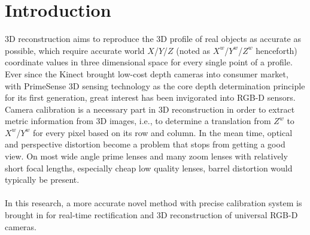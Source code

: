 \chapter{Introduction} %
\label{sens_introduction} %
3D reconstruction aims to reproduce the 3D profile of real objects as accurate as possible, which require accurate world \(X\)/\(Y\)/\(Z\) (noted as \(X^{w}\)/\(Y^{w}\)/\(Z^{w}\)  henceforth) coordinate values in three dimensional space for every single point of a profile. Ever since the Kinect brought low-cost depth cameras into consumer market, with PrimeSense 3D sensing technology as the core depth determination principle for its first generation, great interest has been invigorated into RGB-D sensors. Camera calibration is a necessary part in 3D reconstruction in order to extract metric information from 3D images, i.e., to determine a translation from \(Z^{w}\) to \(X^{w}\)/\(Y^{w}\)  for every pixel based on its row and column. In the mean time, optical and perspective distortion become a problem that stops from getting a good view. On most wide angle prime lenses and many zoom lenses with relatively short focal lengths,  especially cheap low quality lenses, barrel distortion would typically be present.
\\
\\In this research, a more accurate novel method with precise calibration system is brought in for real-time rectification and 3D reconstruction of universal RGB-D cameras. 
